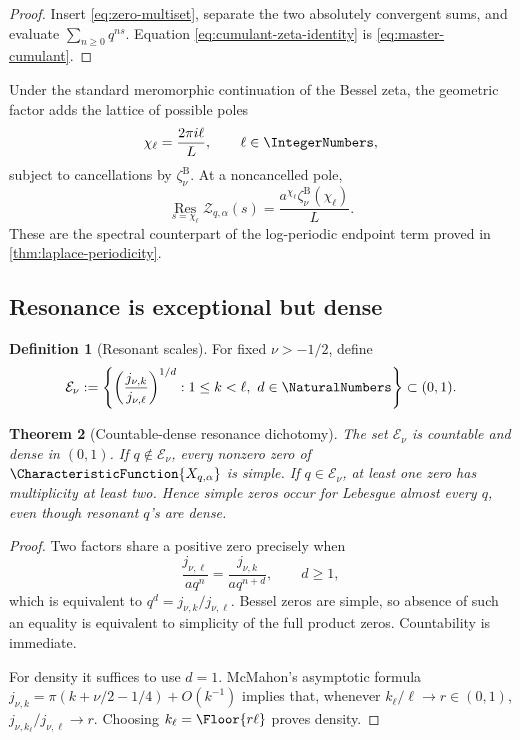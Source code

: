 \documentclass[11pt]{article}
\newtheorem{theorem}{Theorem}[section]
\theoremstyle{definition}
\newtheorem{definition}[theorem]{Definition}
\theoremstyle{remark}
\newcommand{\Zcal}{\mathcal{Z}}
\begin{document}
\begin{proof}
Insert \eqref{eq:zero-multiset}, separate the two absolutely convergent sums,
and evaluate \(\sum_{n\ge0}q^{ns}\).  Equation
\eqref{eq:cumulant-zeta-identity} is \eqref{eq:master-cumulant}.
\end{proof}

Under the standard meromorphic continuation of the Bessel zeta, the geometric
factor adds the lattice of possible poles
\begin{equation}
 \chi_\ell=\frac{2\pi i\ell}{L},\qquad \ell\in\IntegerNumbers,
 \label{eq:complex-dimensions}
\end{equation}
subject to cancellations by \(\zeta_\nu^{\mathrm B}\).  At a noncancelled
pole,
\begin{equation}
 \operatorname*{Res}_{s=\chi_\ell}\Zcal_{q,\alpha}(s)
 =\frac{a^{\chi_\ell}\zeta_\nu^{\mathrm B}(\chi_\ell)}{L}.
 \label{eq:complex-residue}
\end{equation}
These are the spectral counterpart of the log-periodic endpoint term proved
in \cref{thm:laplace-periodicity}.

\subsection{Resonance is exceptional but dense}

\begin{definition}[Resonant scales]
For fixed \(\nu>-1/2\), define
\begin{equation}
 \mathcal E_\nu
 :=\left\{
 \left(\frac{j_{\nu,k}}{j_{\nu,\ell}}\right)^{1/d}:
 1\le k<\ell,\ d\in\NaturalNumbers
 \right\}\subset(0,1).
 \label{eq:resonance-set}
\end{equation}
\end{definition}

\begin{theorem}[Countable-dense resonance dichotomy]
\label{thm:resonance}
The set \(\mathcal E_\nu\) is countable and dense in \((0,1)\).  If
\(q\notin\mathcal E_\nu\), every nonzero zero of
\(\CharacteristicFunction{X_{q,\alpha}}\) is simple.  If \(q\in\mathcal E_\nu\), at least one
zero has multiplicity at least two.  Hence simple zeros occur for Lebesgue
almost every \(q\), even though resonant \(q\)'s are dense.
\end{theorem}

\begin{proof}
Two factors share a positive zero precisely when
\[
 \frac{j_{\nu,\ell}}{aq^n}
 =\frac{j_{\nu,k}}{aq^{n+d}},
 \qquad d\ge1,
\]
which is equivalent to \(q^d=j_{\nu,k}/j_{\nu,\ell}\).  Bessel zeros are
simple, so absence of such an equality is equivalent to simplicity of the
full product zeros.  Countability is immediate.

For density it suffices to use \(d=1\).  McMahon's asymptotic formula \cite{Watson,DLMF}
\(j_{\nu,k}=\pi(k+\nu/2-1/4)+O(k^{-1})\) implies that, whenever
\(k_\ell/\ell\to r\in(0,1)\),
\(j_{\nu,k_\ell}/j_{\nu,\ell}\to r\).  Choosing
\(k_\ell=\Floor{r\ell}\) proves density.
\end{proof}
\end{document}
